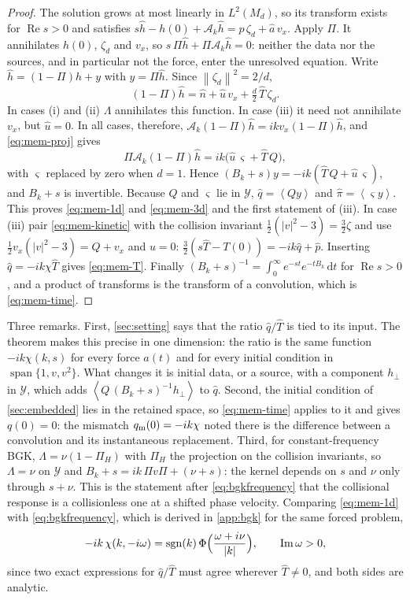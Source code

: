 \documentclass[11pt]{article}
\newcommand{\dd}{\,\mathrm d}
\newcommand{\av}[1]{\left\langle #1\right\rangle}
\newcommand{\A}{\mathcal A}
\newcommand{\sgn}{\operatorname{sgn}}
\newcommand{\Real}{\operatorname{Re}}
\newcommand{\Imag}{\operatorname{Im}}
\newcommand{\norm}[1]{\left\|#1\right\|}
\theoremstyle{definition}
\theoremstyle{remark}
\numberwithin{equation}{section}
\begin{document}
\begin{proof}
The solution grows at most linearly in $L^2(M_d)$, so its transform exists
for $\Real s>0$ and satisfies
$s\widehat h-h(0)+\A_k\widehat h=\widehat p\,\zeta_d+\widehat a\,v_x$.
Apply $\Pi$. It annihilates $h(0)$, $\zeta_d$ and $v_x$, so
$s\,\Pi\widehat h+\Pi\A_k\widehat h=0$: neither the data nor the sources,
and in particular not the force, enter the unresolved equation. Write
$\widehat h=(1-\Pi)\widehat h+y$ with $y=\Pi\widehat h$. Since
$\norm{\zeta_d}^2=2/d$,
\[
 (1-\Pi)\widehat h=\widehat n+\widehat u\,v_x+\tfrac d2\,\widehat T\,\zeta_d .
\]
In cases (i) and (ii) $\Lambda$ annihilates this function. In case (iii)
it need not annihilate $v_x$, but $\widehat u=0$. In all cases, therefore,
$\A_k(1-\Pi)\widehat h=ikv_x(1-\Pi)\widehat h$, and \eqref{eq:mem-proj}
gives
\[
 \Pi\A_k(1-\Pi)\widehat h=ik\bigl(\widehat u\,\varsigma+\widehat T\,Q\bigr),
\]
with $\varsigma$ replaced by zero when $d=1$. Hence
$(B_k+s)y=-ik(\widehat T\,Q+\widehat u\,\varsigma)$, and $B_k+s$ is
invertible. Because $Q$ and $\varsigma$ lie in $\mathcal Y$,
$\widehat q=\av{Qy}$ and $\widehat\pi=\av{\varsigma y}$. This proves
\eqref{eq:mem-1d} and \eqref{eq:mem-3d} and the first statement of (iii).
In case (iii) pair \eqref{eq:mem-kinetic} with the collision invariant
$\tfrac12(|v|^2-3)=\tfrac32\zeta$ and use
$\tfrac12v_x(|v|^2-3)=Q+v_x$ and $u=0$:
$\tfrac32(s\widehat T-T(0))=-ik\widehat q+\widehat p$. Inserting
$\widehat q=-ik\chi\widehat T$ gives \eqref{eq:mem-T}. Finally
$(B_k+s)^{-1}=\int_0^\infty e^{-st}e^{-tB_k}\dd t$ for $\Real s>0$, and a
product of transforms is the transform of a convolution, which is
\eqref{eq:mem-time}.
\end{proof}

Three remarks. First, \cref{sec:setting} says that the ratio
$\widehat q/\widehat T$ is tied to its input. The theorem makes this
precise in one dimension: the ratio is the same function
$-ik\chi(k,s)$ for every force $a(t)$ and for every initial condition in
$\operatorname{span}\{1,v,v^2\}$. What changes it is initial data, or a
source, with a component $h_\perp$ in $\mathcal Y$, which adds
$\av{Q\,(B_k+s)^{-1}h_\perp}$ to $\widehat q$. Second, the initial
condition of \cref{sec:embedded} lies in the retained space, so
\eqref{eq:mem-time} applies to it and gives $q(0)=0$: the mismatch
$q_{\rm m}(0)=-ik\chi$ noted there is the difference between a convolution
and its instantaneous replacement. Third, for constant-frequency BGK,
$\Lambda=\nu(1-\Pi_H)$ with $\Pi_H$ the projection on the collision
invariants, so $\Lambda=\nu$ on $\mathcal Y$ and
$B_k+s=ik\,\Pi v\Pi+(\nu+s)$: the kernel depends on $s$ and $\nu$ only
through $s+\nu$. This is the statement after \eqref{eq:bgkfrequency} that
the collisional response is a collisionless one at a shifted phase
velocity. Comparing \eqref{eq:mem-1d} with \eqref{eq:bgkfrequency}, which
is derived in \cref{app:bgk} for the same forced problem,
\begin{equation}
 -ik\,\chi(k,-i\omega)=\sgn(k)\,\Phi\Bigl(\frac{\omega+i\nu}{|k|}\Bigr),
 \qquad \Imag\omega>0,
 \label{eq:mem-bgk}
\end{equation}
since two exact expressions for $\widehat q/\widehat T$ must agree
wherever $\widehat T\ne0$, and both sides are analytic.
\end{document}
